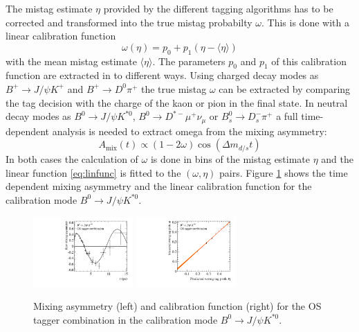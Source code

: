 \documentclass{PoS}
\begin{document}
The mistag estimate $\eta$ provided by the different tagging algorithms has to be corrected and transformed into the true mistag probabilty $\omega$. This is done with a linear calibration function
\begin{equation}
\omega(\eta)=p_0+p_1\left(\eta-\langle\eta\rangle\right)\label{eq:linfunc}
\end{equation}
with the mean mistag estimate $\langle\eta\rangle$. The parameters $p_0$ and $p_1$ of this calibration function are extracted in to different ways. Using charged decay modes as $B^+\to J\!/\!\psi K^+$ and $B^+\to D^0\pi^+$ the true mistag $\omega$ can be extracted by comparing the tag decision with the charge of the kaon or pion in the final state. In neutral decay modes as $B^0\to J\!/\!\psi K^{*0}$, $B^0\to D^{*-}\mu^+\nu_\mu$ or $B_s^0\to D_s^-\pi^+$ a full time-dependent analysis is needed to extract omega from the mixing asymmetry:
\begin{equation}
A_\text{mix}(t)\propto\left(1-2\omega\right)\cos\left(\Delta m_{d/s} t\right)
\end{equation}
In both cases the calculation of $\omega$ is done in bins of the mistag estimate $\eta$ and the linear function \ref{eq:linfunc} is fitted to the $(\omega,\eta)$ pairs. Figure \ref{fig:calibration} shows the time dependent mixing asymmetry and the linear calibration function for the calibration mode $B^0\to J\!/\!\psi K^{*0}$. 
\begin{figure}[htbp]
	\begin{center}
		\includegraphics[width=0.34\textwidth, angle=0]{figs/KstAsym.pdf}
		\includegraphics[width=0.34\textwidth, angle=0]{figs/Bd2JpsiKst-Kst-OST-8ScalingFunction_raw.pdf}
		\small{\caption{Mixing asymmetry (left) and calibration function (right) for the OS tagger combination in the calibration mode $B^0\to J\!/\!\psi K^{*0}$.}}
		\label{fig:calibration}
	\end{center}
\end{figure}
\end{document}
